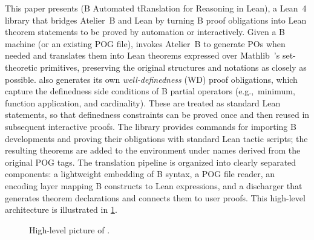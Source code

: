 This paper presents \emph{\barrel} (B Automated tRanslation for Reasoning in Lean), a Lean~4 library that bridges Atelier~B and Lean by turning B proof obligations into Lean theorem statements to be proved by automation or interactively.
Given a B machine (or an existing POG file), \barrel invokes Atelier~B to generate POs when needed and translates them into Lean theorems expressed over Mathlib~\cite{mathlib4}'s set-theoretic primitives, preserving the original structures and notations as closely as possible.
\barrel also generates its own \emph{well-definedness} (WD) proof obligations, which capture the definedness side conditions of B partial operators (e.g.,\ minimum, function application, and cardinality).
These are treated as standard Lean statements, so that definedness constraints can be proved once and then reused in subsequent interactive proofs.
The library provides commands for importing B developments and proving their obligations with standard Lean tactic scripts; the resulting theorems are added to the environment under names derived from the original POG tags.
The translation pipeline is organized into clearly separated components: a lightweight embedding of B syntax, a POG file reader, an encoding layer mapping B constructs to Lean expressions, and a discharger that generates theorem declarations and connects them to user proofs. This high-level architecture is illustrated in \cref{fig:barrel-archi}.



\begin{figure}[t]
	\centering
	\caption{High-level picture of \barrel.}
	\label{fig:barrel-archi}
\end{figure}

